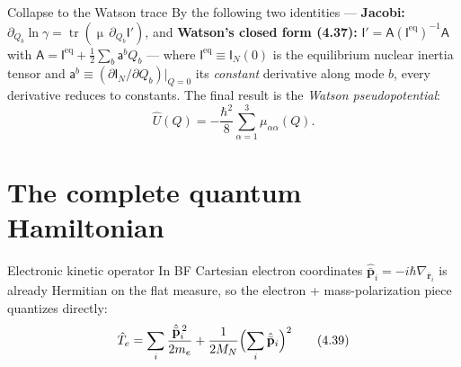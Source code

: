 \documentclass[aspectratio=169,10pt]{beamer}
\newcommand{\Mmu}{\upmu}        %
\newcommand{\stagenum}{0}
\newcommand{\setstage}[1]{\renewcommand{\stagenum}{#1}}
\begin{document}
\begin{frame}{Collapse to the Watson trace}
\setstage{3}
By the following two identities --- \textbf{Jacobi:} $\partial_{Q_b}\!\ln\gamma=\operatorname{tr}(\Mmu\,\partial_{Q_b}\mathsf I')$, and \textbf{Watson's closed form (4.37):} $\mathsf I'=\mathsf A(\mathsf I^{\mathrm{eq}})^{-1}\mathsf A$ with $\mathsf A=\mathsf I^{\mathrm{eq}}+\tfrac12\sum_b \mathsf a^{b}Q_b$ --- where $\mathsf I^{\mathrm{eq}}\equiv\mathsf I_N(0)$ is the \alert{equilibrium} nuclear inertia tensor and $\mathsf a^{b}\equiv(\partial\mathsf I_N/\partial Q_b)|_{Q=0}$ its \emph{constant} derivative along mode $b$, every derivative reduces to constants.
The final result is the \emph{Watson pseudopotential}:
\begin{equation*}
\boxed{\;\hat U(Q)=-\frac{\hbar^2}{8}\sum_{\alpha=1}^{3}\mu_{\alpha\alpha}(Q).\;}\tag{4.38}
\end{equation*}
\end{frame}

\setstage{4}
\section{The complete quantum Hamiltonian}

\begin{frame}{Electronic kinetic operator}
\setstage{4}
In BF Cartesian electron coordinates $\hat{\bar{\mathbf p}}_i=-i\hbar\nabla_{\bar{\mathbf r}_i}$ is already Hermitian on the flat measure, so the electron + mass-polarization piece quantizes directly:
\begin{equation*}
\hat T_e=\sum_i\frac{\hat{\bar{\mathbf p}}_i^{\,2}}{2m_e}+\frac{1}{2M_N}\Bigl(\sum_i\hat{\bar{\mathbf p}}_i\Bigr)^{2} \tag{4.39}
\end{equation*}
\end{frame}
\end{document}
